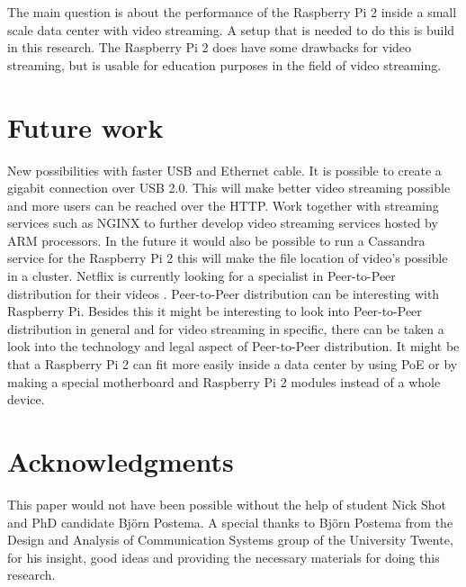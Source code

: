 \documentclass{sig-alternate-br}
\begin{document}
The main question is about the performance of the Raspberry Pi 2 inside a small scale data center with video streaming. A setup that is needed to do this is build in this research. The Raspberry Pi 2 does have some drawbacks for video streaming, but is usable for education purposes in the field of video streaming. 
	


 
\section{Future work}
New possibilities with faster USB and Ethernet cable. It is possible to create a gigabit connection over USB 2.0. This will make better video streaming possible and more users can be reached over the HTTP. Work together with streaming services such as NGINX to further develop video streaming services hosted by ARM processors. In the future it would also be possible to run a Cassandra service for the Raspberry Pi 2 this will make the file location of video's possible in a cluster. Netflix is currently looking for a specialist in  Peer-to-Peer distribution for their videos \cite{netflix}.  Peer-to-Peer distribution can be interesting with Raspberry Pi. Besides this it might be interesting to look into Peer-to-Peer distribution in general and for video streaming in specific, there can be taken a look into the technology and legal aspect of  Peer-to-Peer distribution. It might be that a Raspberry Pi 2 can fit more easily inside a data center by using PoE or by making a special motherboard and Raspberry Pi 2 modules instead of a whole device. 

\section{Acknowledgments}
This paper would not have been possible without the help of  student Nick Shot and PhD candidate Björn Postema. A special thanks to Björn Postema from the Design and Analysis of Communication Systems group of the University Twente, for his insight, good ideas and providing the necessary materials for doing this research.


%
%
\end{document}
